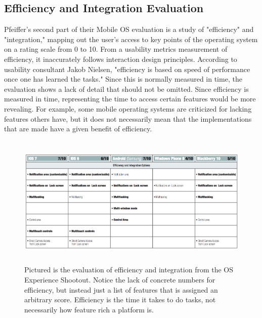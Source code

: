 \documentclass[11pt]{article}
\begin{document}
\subsection{Efficiency and Integration Evaluation}
Pfeiffer's second part of their Mobile OS evaluation is a study of "efficiency" and "integration," mapping out the user's access to key points of the operating system on a rating scale from 0 to 10. From a usability metrics measurement of efficiency, it inaccurately follows interaction design principles. According to usability consultant Jakob Nielsen, "efficiency is based on speed of performance once one has learned the tasks." \cite{Nielsen} Since this is normally measured in time, the evaluation shows a lack of detail that should not be omitted. Since efficiency is measured in time, representing the time to access certain features would be more revealing. For example, some mobile operating systems are criticized for lacking features others have, but it does not necessarily mean that the implementations that are made have a given benefit of efficiency.
\begin{figure}[h]
\begin{center}
\includegraphics[height = 2.5in]{efficiency}
\caption{Pictured is the evaluation of efficiency and integration from the OS Experience Shootout. Notice the lack of concrete numbers for efficiency, but instead just a list of features that is assigned an arbitrary score. Efficiency is the time it takes to do tasks, not necessarily how feature rich a platform is. \cite{Pfeiffer}}
\label{efficiency}
\end{center}
\end{figure}
\end{document}
